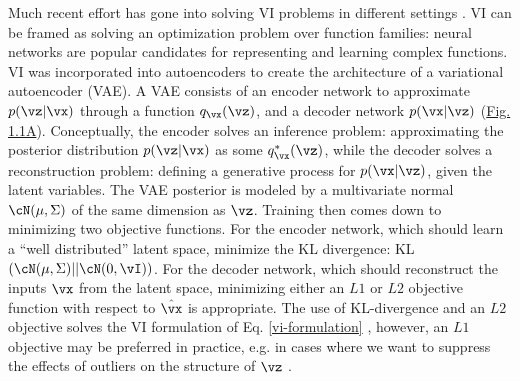 Much recent effort has gone into solving VI problems in different settings \citep{Zhang2019,
Ingraham2017, Bouchard-Cote2010}. VI can be framed as solving an optimization problem over function
families: neural networks are popular candidates for representing and learning complex functions. VI
was incorporated into autoencoders \citep{Kingma2014} to create the architecture of a variational
autoencoder (VAE). A VAE consists of an encoder network to approximate $p(\vz|\vx)$ through a
function $q_\vx(\vz)$, and a decoder network $p(\vx|\vz)$ (\hyperref[fig:fig2]{Fig. 1.1A}). Conceptually, the encoder solves an inference problem: approximating the posterior distribution $p(\vz|\vx)$ as some $q^*_\vx(\vz)$, while the decoder solves a reconstruction problem: defining a generative process for $p(\vx|\vz)$, given the latent variables.
The VAE posterior is modeled by a multivariate normal $\cN(\mathbf{\mu},\Sigma)$ of the same dimension as $\vz$. Training then comes down to minimizing two objective functions. For the encoder network, which should learn a ``well distributed'' latent space, minimize the KL divergence: KL$(\cN(\mathbf{\mu},\Sigma) || \cN(0,\vI)) $. For the decoder network, which should reconstruct the inputs $\vx$ from the latent space, minimizing either an $L1$ or $L2$ objective function with respect to $\hat{\vx}$ is appropriate. The use of KL-divergence and an $L2$ objective solves the VI formulation of Eq. \ref{vi-formulation} \citep{Kingma2014}, however, an $L1$ objective may be preferred in practice, e.g. in cases where we want to suppress the effects of outliers on the structure of $\vz$ \citep{botchkarev2018performance}.





